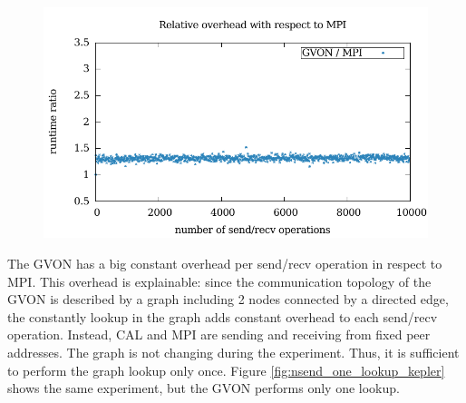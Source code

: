\begin{figure}[H]
\begin{minipage}[t]{0.5\textwidth}
    \includegraphics[width=\textwidth]{plots/50_nsend_overhead_gvon}
  \end{minipage}

\end{figure}




The GVON has a big constant overhead per send/recv operation in
respect to MPI. This overhead is explainable: since the
communication topology of the GVON is described by a graph including 2
nodes connected by a directed edge, the constantly lookup in the graph
adds constant overhead to each send/recv operation.  Instead, CAL and
MPI are sending and receiving from fixed peer addresses. The graph is
not changing during the experiment. Thus, it is sufficient to perform
the graph lookup only once. Figure \ref{fig:nsend_one_lookup_kepler}
shows the same experiment, but the GVON performs only one lookup.


